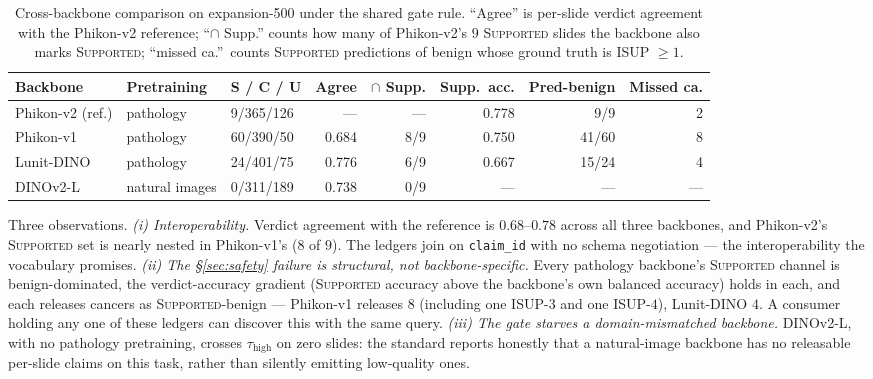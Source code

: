 \documentclass{article}
\newcommand{\SafeNum}[1]{#1}
\begin{document}
\begin{table}[h]
\centering
\caption{Cross-backbone comparison on expansion-500 under the shared gate rule. ``Agree'' is per-slide verdict agreement with the Phikon-v2 reference; ``$\cap$ Supp.'' counts how many of Phikon-v2's $\SafeNum{9}$ \textsc{Supported} slides the backbone also marks \textsc{Supported}; ``missed ca.''\ counts \textsc{Supported} predictions of benign whose ground truth is ISUP $\ge \SafeNum{1}$.}
\label{tab:cross-backbone}
\setlength{\tabcolsep}{4pt}
\small
\begin{tabular}{@{}lllrrrrr@{}}
\toprule
Backbone & Pretraining & S / C / U & Agree & $\cap$ Supp. & Supp.\ acc. & Pred-benign & Missed ca.\\
\midrule
Phikon-v2 (ref.) & pathology & \SafeNum{9}/\SafeNum{365}/\SafeNum{126} & --- & --- & \SafeNum{0.778} & \SafeNum{9}/\SafeNum{9} & \SafeNum{2} \\
Phikon-v1 & pathology & \SafeNum{60}/\SafeNum{390}/\SafeNum{50} & \SafeNum{0.684} & \SafeNum{8}/\SafeNum{9} & \SafeNum{0.750} & \SafeNum{41}/\SafeNum{60} & \SafeNum{8} \\
Lunit-DINO & pathology & \SafeNum{24}/\SafeNum{401}/\SafeNum{75} & \SafeNum{0.776} & \SafeNum{6}/\SafeNum{9} & \SafeNum{0.667} & \SafeNum{15}/\SafeNum{24} & \SafeNum{4} \\
DINOv2-L & natural images & \SafeNum{0}/\SafeNum{311}/\SafeNum{189} & \SafeNum{0.738} & \SafeNum{0}/\SafeNum{9} & --- & --- & --- \\
\bottomrule
\end{tabular}
\end{table}

Three observations. \emph{(i) Interoperability.} Verdict agreement with the reference is $\SafeNum{0.68}$--$\SafeNum{0.78}$ across all three backbones, and Phikon-v2's \textsc{Supported} set is nearly nested in Phikon-v1's ($\SafeNum{8}$ of $\SafeNum{9}$). The ledgers join on \texttt{claim\_id} with no schema negotiation --- the interoperability the vocabulary promises. \emph{(ii) The \S\ref{sec:safety} failure is structural, not backbone-specific.} Every pathology backbone's \textsc{Supported} channel is benign-dominated, the verdict-accuracy gradient (\textsc{Supported} accuracy above the backbone's own balanced accuracy) holds in each, and each releases cancers as \textsc{Supported}-benign --- Phikon-v1 releases $\SafeNum{8}$ (including one ISUP-$\SafeNum{3}$ and one ISUP-$\SafeNum{4}$), Lunit-DINO $\SafeNum{4}$. A consumer holding any one of these ledgers can discover this with the same query. \emph{(iii) The gate starves a domain-mismatched backbone.} DINOv2-L, with no pathology pretraining, crosses $\tau_{\text{high}}$ on zero slides: the standard reports honestly that a natural-image backbone has no releasable per-slide claims on this task, rather than silently emitting low-quality ones.
\end{document}

